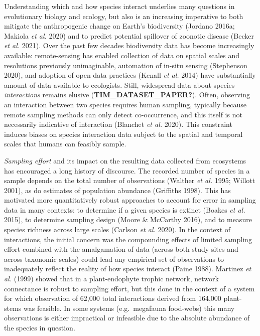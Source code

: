 \documentclass[10pt,oneside]{article}
\begin{document}
Understanding which and how species interact underlies many questions in
evolutionary biology and ecology, but also is an increasing imperative
to both mitigate the anthropogenic change on Earth's biodiversity
(Jordano 2016a; Makiola \emph{et al.} 2020) and to predict potential
spillover of zoonotic disease (Becker \emph{et al.} 2021). Over the past
few decades biodiversity data has become increasingly available:
remote-sensing has enabled collection of data on spatial scales and
resolutions previously unimaginable, automation of in-situ sensing
(Stephenson 2020), and adoption of open data practices (Kenall \emph{et
al.} 2014) have substantially amount of data available to ecologists.
Still, widespread data about species \emph{interactions} remains elusive
(\textbf{TIM\_DATASET\_PAPER?}). Often, observing an interaction between
two species requires human sampling, typically because remote sampling
methods can only detect co-occurrence, and this itself is not
necessarily indicative of interaction (Blanchet \emph{et al.} 2020).
This constraint induces biases on species interaction data subject to
the spatial and temporal scales that humans can feasibly sample.

\emph{Sampling effort} and its impact on the resulting data collected
from ecosystems has encouraged a long history of discourse. The recorded
number of species in a sample depends on the total number of
observations (Walther \emph{et al.} 1995; Willott 2001), as do estimates
of population abundance (Griffiths 1998). This has motivated more
quantitatively robust approaches to account for error in sampling data
in many contexts: to determine if a given species is extinct (Boakes
\emph{et al.} 2015), to determine sampling design (Moore \& McCarthy
2016), and to measure species richness across large scales (Carlson
\emph{et al.} 2020). In the context of interactions, the initial concern
was the compounding effects of limited sampling effort combined with the
amalgamation of data (across both study sites and across taxonomic
scales) could lead any empirical set of observations to inadequately
reflect the reality of how species interact (Paine 1988). Martinez
\emph{et al.} (1999) showed that in a plant-endophyte trophic network,
network connectance is robust to sampling effort, but this done in the
context of a system for which observation of 62,000 total interactions
derived from 164,000 plant-stems was feasible. In some systems
(e.g.~megafauna food-webs) this many observations is either impractical
or infeasible due to the absolute abundance of the species in question.
\end{document}
